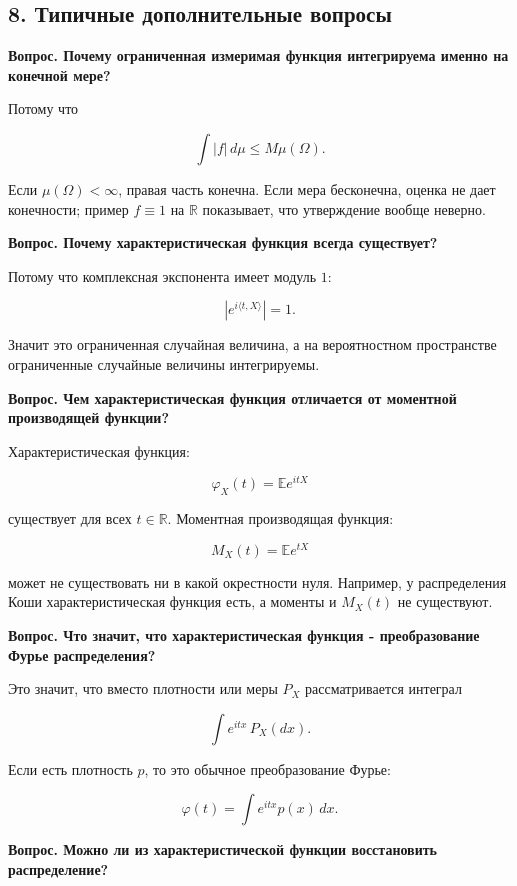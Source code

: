 \documentclass[
  11pt,
  a4paper,
]{article}
\begin{document}
\subsection{8. Типичные дополнительные
вопросы}\label{ux442ux438ux43fux438ux447ux43dux44bux435-ux434ux43eux43fux43eux43bux43dux438ux442ux435ux43bux44cux43dux44bux435-ux432ux43eux43fux440ux43eux441ux44b}

\textbf{Вопрос. Почему ограниченная измеримая функция интегрируема
именно на конечной мере?}

Потому что

\[
\int |f|\,d\mu\le M\mu(\Omega).
\]

Если \(\mu(\Omega)<\infty\), правая часть конечна. Если мера бесконечна,
оценка не дает конечности; пример \(f\equiv1\) на \(\mathbb R\)
показывает, что утверждение вообще неверно.

\textbf{Вопрос. Почему характеристическая функция всегда существует?}

Потому что комплексная экспонента имеет модуль \(1\):

\[
|e^{i\langle t,X\rangle}|=1.
\]

Значит это ограниченная случайная величина, а на вероятностном
пространстве ограниченные случайные величины интегрируемы.

\textbf{Вопрос. Чем характеристическая функция отличается от моментной
производящей функции?}

Характеристическая функция:

\[
\varphi_X(t)=\mathbb E e^{itX}
\]

существует для всех \(t\in\mathbb R\). Моментная производящая функция:

\[
M_X(t)=\mathbb E e^{tX}
\]

может не существовать ни в какой окрестности нуля. Например, у
распределения Коши характеристическая функция есть, а моменты и
\(M_X(t)\) не существуют.

\textbf{Вопрос. Что значит, что характеристическая функция -
преобразование Фурье распределения?}

Это значит, что вместо плотности или меры \(P_X\) рассматривается
интеграл

\[
\int e^{itx}\,P_X(dx).
\]

Если есть плотность \(p\), то это обычное преобразование Фурье:

\[
\varphi(t)=\int e^{itx}p(x)\,dx.
\]

\textbf{Вопрос. Можно ли из характеристической функции восстановить
распределение?}
\end{document}
